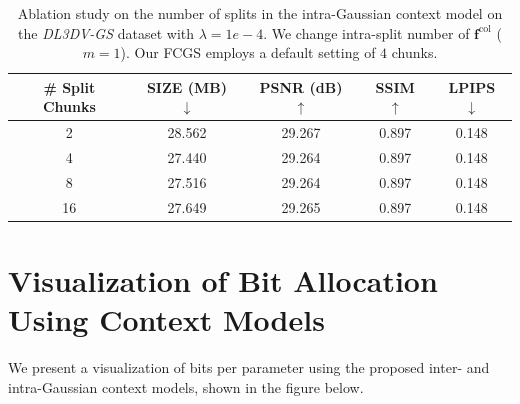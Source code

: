 \documentclass{article} %
\begin{document}
\begin{table}[h]
    \centering
    \caption{Ablation study on the number of splits in the intra-Gaussian context model on the \textit{DL3DV-GS} dataset with $\lambda=1e-4$. We change intra-split number of $\bm{f}^{\text{col}}$ ($m=1$). Our FCGS employs a default setting of $4$ chunks.}
    \vspace{5pt}
    \renewcommand{\arraystretch}{1.20}
    \setlength{\tabcolsep}{8pt}  
    \begin{tabular}{c|c|ccc}
        \toprule[2pt]
        \# Split Chunks & SIZE (MB) $\downarrow$   & PSNR (dB) $\uparrow$ & SSIM $\uparrow$ & LPIPS $\downarrow$ \\  \bottomrule
        2 & 28.562 & 29.267 & 0.897 & 0.148     \\
        4 & 27.440 & 29.264 & 0.897 & 0.148     \\
        8 & 27.516 & 29.264 & 0.897 & 0.148     \\
        16 & 27.649 & 29.265 & 0.897 & 0.148     \\ \bottomrule[2pt]
    \end{tabular}
    \label{tab:number_of_splits_intra}
\end{table}

\clearpage



\section{Visualization of Bit Allocation Using Context Models}
\label{sec:visualize_context}

We present a visualization of bits per parameter using the proposed inter- and intra-Gaussian context models, shown in the figure below.
\end{document}
